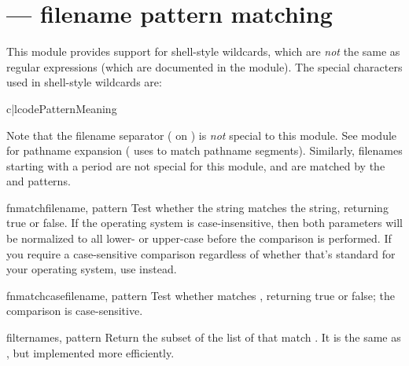 \section{ ---
         \UNIX{} filename pattern matching}




This module provides support for \UNIX{} shell-style wildcards, which
are \emph{not} the same as regular expressions (which are documented
in the  module).  The special
characters used in shell-style wildcards are:

\begin{tableii}{c|l}{code}{Pattern}{Meaning}
\end{tableii}

Note that the filename separator ( on \UNIX{}) is \emph{not}
special to this module.  See module
 for pathname expansion
( uses  to match pathname
segments).  Similarly, filenames starting with a period are
not special for this module, and are matched by the \code{*} and
 patterns.


\begin{funcdesc}{fnmatch}{filename, pattern}
Test whether the  string matches the 
string, returning true or false.  If the operating system is
case-insensitive, then both parameters will be normalized to all
lower- or upper-case before the comparison is performed.  If you
require a case-sensitive comparison regardless of whether that's
standard for your operating system, use 
instead.
\end{funcdesc}

\begin{funcdesc}{fnmatchcase}{filename, pattern}
Test whether  matches , returning true or
false; the comparison is case-sensitive.
\end{funcdesc}

\begin{funcdesc}{filter}{names, pattern}
Return the subset of the list of  that match .
It is the same as , but
implemented more efficiently.
\end{funcdesc}

\begin{seealso}
\end{seealso}
